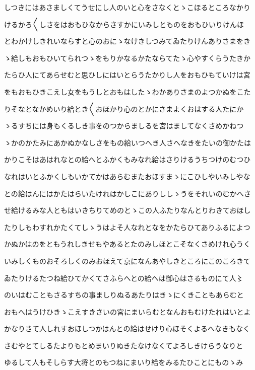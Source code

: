 \documentclass[a4paper,11pt,landscape]{ltjtarticle}
\begin{document}
しつきにはあさましくてうせにし人のいと心をさなくとゝこほるところなかり
\par\medskip
けるかろ〱しさをはおもひなからさすかにいみしとものをおもひいりけんほ
\par\medskip
とわかけしきれいならすと心のおにゝなけきしつみてゐたりけんありさまをき
\par\medskip
ゝ給しもおもひいてられつゝをもりかなるかたならてたゝ心やすくらうたきか
\par\medskip
たらひ人にてあらせむと思ひしにはいとらうたかりし人をおもひもていけは宮
\par\medskip
をもおもひきこえし女をもうしとおもはしたゝわかありさまのよつかぬをこた
\par\medskip
りそなとなかめいり給とき〱おほかり心のとかにさまよくおはする人たにか
\par\medskip
ゝるすちには身もくるしき事をのつからましるを宮はましてなくさめかねつ
\par\medskip
ゝかのかたみにあかぬかなしさをもの給いつへき人さへなきをたいの御かたは
\par\medskip
かりこそはあはれなとの給へとふかくもみなれ給はさりけるうちつけのむつひ
\par\medskip
なれはいとふかくしもいかてかはあらむまたおほすまゝにこひしやいみしやな
\par\medskip
との給はんにはかたはらいたけれはかしこにありししゝうをそれいのむかへさ
\par\medskip
せ給けるみな人ともはいきちりてめのとゝこの人ふたりなんとりわきておほし
\par\medskip
たりしもわすれかたくてしゝうはよそ人なれとなをかたらひてありふるによつ
\par\medskip
かぬかはのをともうれしきせもやあるとたのみしほとこそなくさめけれ心うく
\par\medskip
いみしくものおそろしくのみおほえて京になんあやしきところにこのころきて
\par\medskip
ゐたりけるたつね給ひてかくてさふらへとの給へは御心はさるものにて人〻
\par\medskip
のいはむこともさるすちの事ましりぬるあたりはきゝにくきこともあらむと
\par\medskip
おもへはうけひきゝこえすきさいの宮にまいらむとなんおもむけたれはいとよ
\par\medskip
かなりさて人しれすおほしつかはんとの給はせけり心ほそくよるへなきもなく
\par\medskip
さむやとてしるたよりもとめまいりぬきたなけなくてよろしきけらうなりと
\par\medskip
ゆるして人もそしらす大将とのもつねにまいり給をみるたひことにものゝみ
\end{document}
